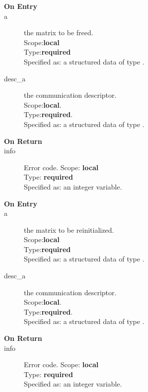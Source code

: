 %
%


\begin{description}
\item[\bf On Entry]
\item[a] the matrix to be freed.\\
Scope:{\bf local}\\
Type:{\bf required}\\
Specified as: a structured data of type \spdata.
\item[desc\_a] the communication descriptor.\\
Scope:{\bf local}.\\
Type:{\bf required}.\\
Specified as: a structured data of type \descdata.
\end{description}

\begin{description}
\item[\bf On Return]
\item[info] Error code.
Scope: {\bf local} \\
Type: {\bf required}\\
Specified as: an integer variable.
\end{description}




%
%


\begin{description}
\item[\bf On Entry]
\item[a] the matrix to be reinitialized.\\
Scope:{\bf local}\\
Type:{\bf required}\\
Specified as: a structured data of type \spdata.
\item[desc\_a] the communication descriptor.\\
Scope:{\bf local}.\\
Type:{\bf required}.\\
Specified as: a structured data of type \descdata.
\end{description}

\begin{description}
\item[\bf On Return]
\item[info] Error code.
Scope: {\bf local} \\
Type: {\bf required}\\
Specified as: an integer variable.
\end{description}

